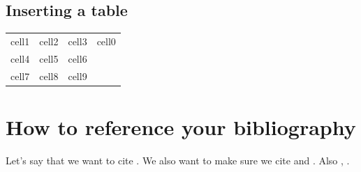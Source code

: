 \documentclass[11pt]{article}
\begin{document}


\subsection*{Inserting a table}

\begin{center}
\begin{tabular}{ |c|c|||c|c| } 
 \hline
 \hline
 \hline
 cell1 & cell2 & cell3 & cell0 \\ 
 cell4 & cell5 & cell6 \\ 
 cell7 & cell8 & cell9 \\ 
 \hline
\end{tabular}
\end{center}

\section*{How to reference your bibliography}




Let's say that we want to cite \cite{knuthwebsite}. We also want to make sure we cite \cite{Vickrey1961} and \cite{Golumbic2004}. Also \cite{einstein}, \cite{dirac}.



% 
\printbibliography


\printbibliography[type=article,title={Articles only}]
\printbibliography[type=book,title={Books only}]
 
\printbibliography[keyword={physics},title={Physics-related only}]
\printbibliography[keyword={latex},title={\LaTeX-related only}]



\end{document}
